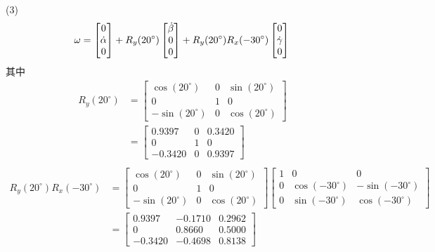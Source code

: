 \documentclass[UTF8, 13pt]{ctexart}
\begin{document}
(3)
\[
    \omega = \begin{bmatrix}
                0 \\ \dot{\alpha} \\ 0
            \end{bmatrix} 
            + R_y(20^\circ) \begin{bmatrix}
                \dot{\beta} \\ 0 \\ 0
            \end{bmatrix}
            + R_y(20^\circ) R_x(-30^\circ) \begin{bmatrix}
                0 \\ \dot{\gamma} \\ 0
            \end{bmatrix} \\
\]
其中
\[
\begin{aligned}
    R_y(20^\circ) &= 
        \begin{bmatrix}
            \cos(20^\circ) & 0 & \sin(20^\circ) \\
            0 & 1 & 0 \\
            -\sin(20^\circ) & 0 & \cos(20^\circ)
        \end{bmatrix} \\
        &=
        \begin{bmatrix}
            0.9397 & 0 & 0.3420 \\
            0 & 1 & 0 \\
            -0.3420 & 0 & 0.9397
        \end{bmatrix} \\
\end{aligned} 
\]
\[
\begin{aligned}
    R_y(20^\circ) R_x(-30^\circ) &=
        \begin{bmatrix}
            \cos(20^\circ) & 0 & \sin(20^\circ) \\
            0 & 1 & 0 \\
            -\sin(20^\circ) & 0 & \cos(20^\circ)
        \end{bmatrix}
        \begin{bmatrix}
            1 & 0 & 0 \\
            0 & \cos(-30^\circ) & -\sin(-30^\circ) \\
            0 & \sin(-30^\circ) & \cos(-30^\circ)
        \end{bmatrix} \\
        &=
        \begin{bmatrix}
            0.9397 & -0.1710 & 0.2962 \\
            0 & 0.8660 & 0.5000 \\
            -0.3420 & -0.4698 & 0.8138
        \end{bmatrix} \\
\end{aligned}
\]
\end{document}
